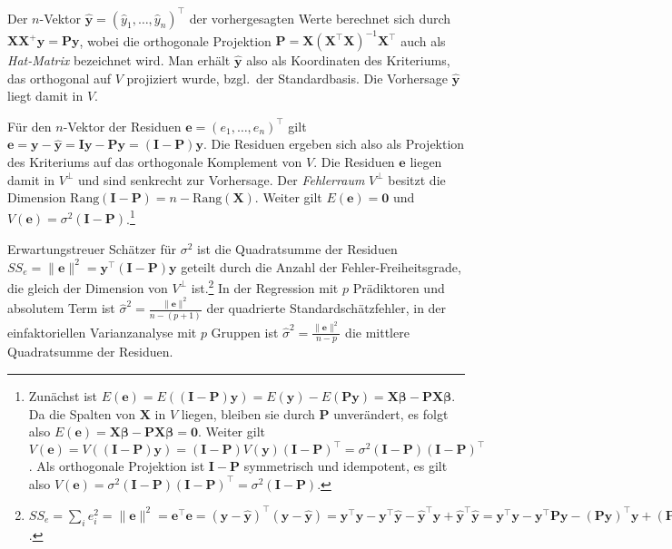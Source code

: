 Der $n$-Vektor $\hat{\bm{y}} = (\hat{y}_{1}, \ldots, \hat{y}_{n})^{\top}$ der vorhergesagten Werte berechnet sich durch $\bm{X} \bm{X}^{+} \bm{y} = \bm{P} \bm{y}$, wobei die orthogonale Projektion $\bm{P} = \bm{X} (\bm{X}^{\top} \bm{X})^{-1} \bm{X}^{\top}$ auch als \emph{Hat-Matrix} bezeichnet wird. Man erhält $\hat{\bm{y}}$ also als Koordinaten des Kriteriums, das orthogonal auf $V$ projiziert wurde, bzgl.\ der Standardbasis. Die Vorhersage $\hat{\bm{y}}$ liegt damit in $V$.

Für den $n$-Vektor der Residuen $\bm{e} = (e_{1}, \ldots, e_{n})^{\top}$ gilt $\bm{e} = \bm{y} - \hat{\bm{y}} = \bm{I} \bm{y} - \bm{P} \bm{y} = (\bm{I} - \bm{P}) \bm{y}$. Die Residuen ergeben sich also als Projektion des Kriteriums auf das orthogonale Komplement von $V$. Die Residuen $\bm{e}$ liegen damit in $V^{\perp}$ und sind senkrecht zur Vorhersage. Der \emph{Fehlerraum} $V^{\perp}$ besitzt die Dimension $\text{Rang}(\bm{I}-\bm{P}) = n - \text{Rang}(\bm{X})$. Weiter gilt $E(\bm{e}) = \bm{0}$ und $V(\bm{e}) = \sigma^{2} (\bm{I} - \bm{P})$.\footnote{Zunächst ist $E(\bm{e}) = E((\bm{I} - \bm{P}) \bm{y}) = E(\bm{y}) - E(\bm{P} \bm{y}) = \bm{X} \bm{\beta} - \bm{P} \bm{X} \bm{\beta}$. Da die Spalten von $\bm{X}$ in $V$ liegen, bleiben sie durch $\bm{P}$ unverändert, es folgt also $E(\bm{e}) = \bm{X} \bm{\beta} - \bm{P} \bm{X} \bm{\beta} = \bm{0}$. Weiter gilt $V(\bm{e}) = V((\bm{I} - \bm{P}) \bm{y}) = (\bm{I} - \bm{P}) V(\bm{y}) (\bm{I} - \bm{P})^{\top} = \sigma^{2} (\bm{I} - \bm{P}) (\bm{I} - \bm{P})^{\top}$. Als orthogonale Projektion ist $\bm{I} - \bm{P}$ symmetrisch und idempotent, es gilt also $V(\bm{e}) = \sigma^{2} (\bm{I} - \bm{P}) (\bm{I} - \bm{P})^{\top} = \sigma^{2} (\bm{I} - \bm{P})$.}

Erwartungstreuer Schätzer für $\sigma^{2}$ ist die Quadratsumme der Residuen $SS_{e} = \|\bm{e}\|^{2} = \bm{y}^{\top} (\bm{I} - \bm{P}) \bm{y}$ geteilt durch die Anzahl der Fehler-Freiheitsgrade, die gleich der Dimension von $V^{\perp}$ ist.\footnote{\label{ftn:SSe}$SS_{e} = \sum_{i} e_{i}^{2} = \|\bm{e}\|^{2} = \bm{e}^{\top} \bm{e} = (\bm{y} - \hat{\bm{y}})^{\top} (\bm{y} - \hat{\bm{y}}) = \bm{y}^{\top} \bm{y} - \bm{y}^{\top} \hat{\bm{y}} - \hat{\bm{y}}^{\top} \bm{y} + \hat{\bm{y}}^{\top} \hat{\bm{y}} = \bm{y}^{\top} \bm{y} - \bm{y}^{\top} \bm{P} \bm{y} - (\bm{P} \bm{y})^{\top} \bm{y} + (\bm{P} \bm{y})^{\top} (\bm{P} \bm{y}) = \bm{y}^{\top} \bm{y} - \bm{y}^{\top} \bm{P} \bm{y} - \bm{y}^{\top} \bm{P} \bm{y} + \bm{y}^{\top} \bm{P} \bm{P} \bm{y} = \bm{y}^{\top} \bm{y} - \bm{y}^{\top} \bm{P} \bm{y} = \bm{y}^{\top} (\bm{I} - \bm{P}) \bm{y}$.} In der Regression mit $p$ Prädiktoren und absolutem Term ist $\hat{\sigma}^{2} = \frac{\|\bm{e}\|^{2}}{n-(p+1)}$ der quadrierte Standardschätzfehler, in der einfaktoriellen Varianzanalyse mit $p$ Gruppen ist $\hat{\sigma}^{2} = \frac{\|\bm{e}\|^{2}}{n-p}$ die mittlere Quadratsumme der Residuen.

